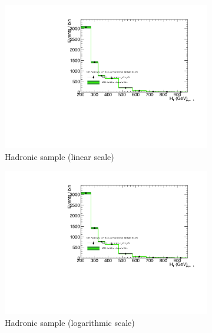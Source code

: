 \clearpage
\begin{figure}[h!]
  \centering
  \begin{subfigure}[b]{0.48\textwidth}
    \includegraphics[width=\textwidth,page=1]
    {Figs/results/v0/greenBand/bestFit_2012dev_RQcdZero_fZinvAll_2b_le3j-1_smOnly}
    \caption{Hadronic sample (linear scale)}
  \end{subfigure}
  \begin{subfigure}[b]{0.48\textwidth}
    \includegraphics[width=\textwidth,page=2]
    {Figs/results/v0/greenBand/bestFit_2012dev_RQcdZero_fZinvAll_2b_le3j-1_smOnly}
    \caption{Hadronic sample (logarithmic scale)}
  \end{subfigure}
  \begin{subfigure}[b]{0.48\textwidth}

\end{subfigure}
\end{figure}
